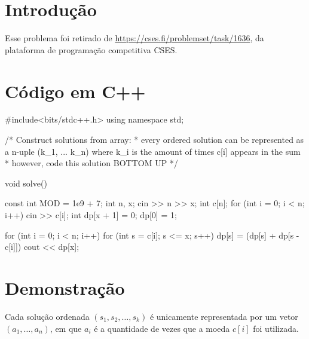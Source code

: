 \documentclass{article}
\begin{document}
\section{Introdução}
Esse problema foi retirado de \url{https://cses.fi/problemset/task/1636}, da plataforma de programação competitiva CSES. 


\section{Código em C++}

\begin{code}[C++]
#include<bits/stdc++.h>
using namespace std;
	
/*
Construct solutions from array: 
* every ordered solution can be represented as a n-uple (k_1, ... k_n)
	where k_i is the amount of times c[i] appears in the sum
* however, code this solution BOTTOM UP
*/
	
	
void solve(){
	const int MOD = 1e9 + 7;
	int n, x;
	cin >> n >> x;
	int c[n];
	for (int i = 0; i < n; i++){
	cin >> c[i];
	}
	int dp[x + 1] = {0};
	dp[0] = 1;
	
	for (int i = 0; i < n; i++){
	for (int s = c[i]; s <= x; s++){
		dp[s] = (dp[s] + dp[s - c[i]]) %
	}
	}
	cout << dp[x];
}	
\end{code}


\section{Demonstração}
\begin{lemma}
	Cada solução ordenada \((s_1, s_2, \dotsc, s_k)\) é unicamente representada por um vetor \((a_1, \dotsc, a_n)\), em que \(a_i\) é a quantidade de vezes que a moeda \(c[i]\) foi utilizada.
\end{lemma}
\end{document}
